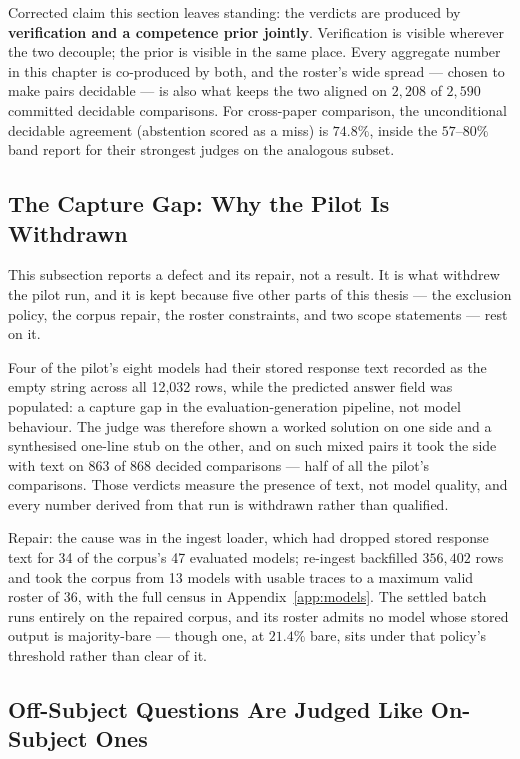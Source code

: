 Corrected claim this section leaves standing:
the verdicts are produced by \textbf{verification and a competence
prior jointly}. Verification is visible wherever the two decouple; the
prior is visible in the same place. Every aggregate number in this
chapter is co-produced by both, and the roster's wide spread ---
chosen to make pairs decidable --- is also what keeps the two aligned
on $2{,}208$ of $2{,}590$ committed decidable comparisons. For
cross-paper comparison, the unconditional decidable agreement
(abstention scored as a miss) is $74.8\%$, inside the $57$--$80\%$
band \textcite{stephan2024calculation} report for their strongest
judges on the analogous subset.

\subsection{The Capture Gap: Why the Pilot Is Withdrawn}\label{sec:res-capture-gap}

This subsection reports a defect and its repair, not a result. It is
what withdrew the pilot run, and it is kept because five other parts of
this thesis --- the exclusion policy, the corpus repair, the roster
constraints, and two scope statements --- rest on it.

Four of the pilot's eight models had their stored
response text recorded as the empty string across all 12{,}032 rows,
while the predicted answer field was populated: a capture gap in the
evaluation-generation pipeline, not model behaviour. The judge was
therefore shown a worked solution on one side and a synthesised
one-line stub on the other, and on such mixed pairs it took the side
with text on $863$ of $868$ decided comparisons --- half of all the
pilot's comparisons. Those verdicts measure the presence of text, not
model quality, and every number derived from that run is withdrawn
rather than qualified.

Repair: the cause was in the ingest loader, which had dropped stored
response text for 34 of the corpus's 47 evaluated models; re-ingest
backfilled $356{,}402$ rows and took the corpus from 13 models with
usable traces to a maximum valid roster of 36, with the full census in
Appendix~\ref{app:models}. The settled batch runs entirely on the
repaired corpus, and its roster admits no model whose stored output is
majority-bare --- though one, at $21.4\%$ bare, sits under that
policy's threshold rather than clear of it.

\subsection{Off-Subject Questions Are Judged Like On-Subject Ones}\label{sec:res-offsubject}

